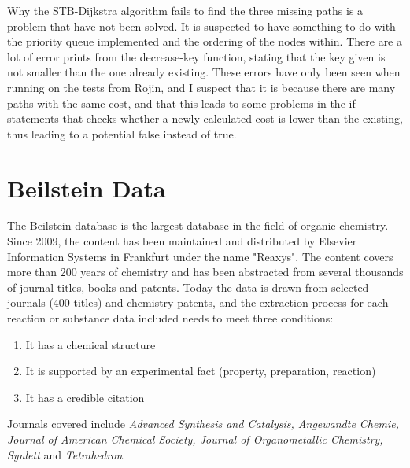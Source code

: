 \documentclass[a4paper,10pt,titlepage]{paper}
\begin{document}
Why the STB-Dijkstra algorithm fails to find the three missing paths is a problem that have not been solved. It is suspected to have something to do with the priority queue implemented and the ordering of the nodes within. There are a lot of error prints from the decrease-key function, stating that the key given is not smaller than the one already existing. These errors have only been seen when running on the tests from Rojin, and I suspect that it is because there are many paths with the same cost, and that this leads to some problems in the if statements that checks whether a newly calculated cost is lower than the existing, thus leading to a potential false instead of true.

\section{Beilstein Data}
\label{sec::BeilsteinData}
The Beilstein database is the largest database in the field of organic chemistry. Since 2009, the content has been maintained and distributed by Elsevier Information Systems in Frankfurt under the name "Reaxys".
The content covers more than 200 years of chemistry and has been abstracted from several thousands of journal titles, books and patents. Today the data is drawn from selected journals (400 titles) and chemistry patents, and the extraction process for each reaction or substance data included needs to meet three conditions:
\begin{enumerate}
\item
It has a chemical structure
\item
It is supported by an experimental fact (property, preparation, reaction)
\item
It has a credible citation
\end{enumerate}
Journals covered include \textit{Advanced Synthesis and Catalysis, Angewandte Chemie, Journal of American Chemical Society, Journal of Organometallic Chemistry, Synlett} and \textit{Tetrahedron}. \cite{WikiReaxys}\cite{WikiBeilstein}
\end{document}
